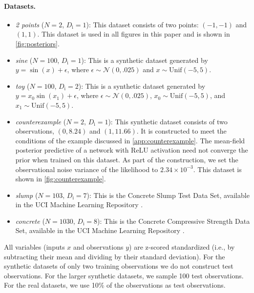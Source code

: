 \documentclass[twoside]{article}
\renewcommand{\ss}[1]{_{\text{#1}}}
\renewcommand{\ss}[1]{_{\text{#1}}}        %
\theoremstyle{theoremstyle}
\begin{document}
\paragraph{Datasets.} 
\begin{itemize}
    \item \textit{2 points} ($N=2$, $D\ss{i}=1$): This dataset consists of two points: $(-1,-1)$ and $(1,1)$. This dataset is used in all figures in this paper and is shown in \cref{fig:posteriors}.
    
    \item \textit{sine} ($N=100$, $D\ss{i}=1$): This is a synthetic dataset generated by $y = \sin(x) + \epsilon$, where $\epsilon \sim \mathcal{N}(0, .025)$ and $x\sim\text{Unif}(-5,5)$. 
    
    \item \textit{toy} ($N=100$, $D\ss{i}=2$): This is a synthetic dataset generated by $y = x_0 \sin(x_1) + \epsilon$, where $\epsilon \sim \mathcal{N}(0, .025)$,  $x_0\sim\text{Unif}(-5,5)$, and $x_1\sim\text{Unif}(-5,5)$.
    
    \item \textit{counterexample} ($N=2$, $D\ss{i}=1$): This synthetic dataset consists of two observations, $(0,8.24)$ and $(1,11.66)$. It is constructed to meet the conditions of the example discussed in \cref{app:counterexample}. The mean-field posterior predictive of a network with ReLU activation need not converge the prior when trained on this dataset. As part of the construction, we set the observational noise variance of the likelihood to $2.34 \times 10^{-3}$. This dataset is shown in \cref{fig:counterexample}.
    
    \item \textit{slump} ($N=103$, $D\ss{i}=7$): This is the Concrete Slump Test Data Set, available in the UCI Machine Learning Repository \citep{uci_slump}.
    
    \item \textit{concrete} ($N=1030$, $D\ss{i}=8$): This is the Concrete Compressive Strength Data Set, available in the UCI Machine Learning Repository \citep{uci_concrete}.
\end{itemize}
All variables (inputs $x$ and observations $y$) are z-scored standardized (i.e., by subtracting their mean and dividing by their standard deviation). For the synthetic datasets of only two training observations we do not construct test observations. For the larger synthetic datasets, we sample 100 test observations. For the real datasets, we use 10\% of the observations as test observations.
\end{document}
